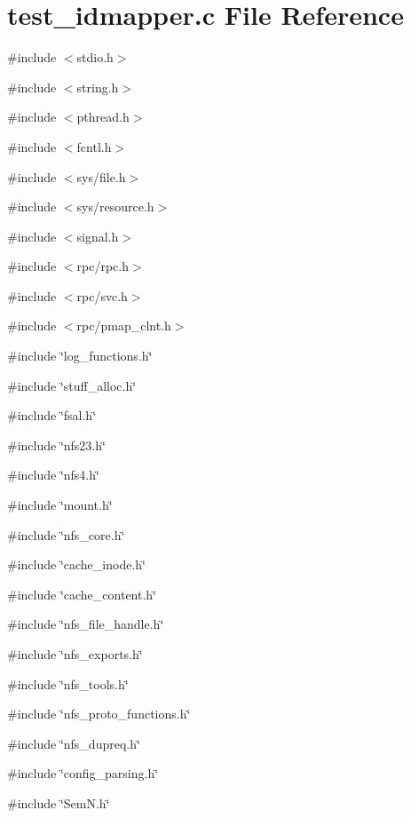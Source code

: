 \section{test\_\-idmapper.c File Reference}
\label{test__idmapper_8c}
{\ttfamily \#include $<$stdio.h$>$}\par
{\ttfamily \#include $<$string.h$>$}\par
{\ttfamily \#include $<$pthread.h$>$}\par
{\ttfamily \#include $<$fcntl.h$>$}\par
{\ttfamily \#include $<$sys/file.h$>$}\par
{\ttfamily \#include $<$sys/resource.h$>$}\par
{\ttfamily \#include $<$signal.h$>$}\par
{\ttfamily \#include $<$rpc/rpc.h$>$}\par
{\ttfamily \#include $<$rpc/svc.h$>$}\par
{\ttfamily \#include $<$rpc/pmap\_\-clnt.h$>$}\par
{\ttfamily \#include \char`\"{}log\_\-functions.h\char`\"{}}\par
{\ttfamily \#include \char`\"{}stuff\_\-alloc.h\char`\"{}}\par
{\ttfamily \#include \char`\"{}fsal.h\char`\"{}}\par
{\ttfamily \#include \char`\"{}nfs23.h\char`\"{}}\par
{\ttfamily \#include \char`\"{}nfs4.h\char`\"{}}\par
{\ttfamily \#include \char`\"{}mount.h\char`\"{}}\par
{\ttfamily \#include \char`\"{}nfs\_\-core.h\char`\"{}}\par
{\ttfamily \#include \char`\"{}cache\_\-inode.h\char`\"{}}\par
{\ttfamily \#include \char`\"{}cache\_\-content.h\char`\"{}}\par
{\ttfamily \#include \char`\"{}nfs\_\-file\_\-handle.h\char`\"{}}\par
{\ttfamily \#include \char`\"{}nfs\_\-exports.h\char`\"{}}\par
{\ttfamily \#include \char`\"{}nfs\_\-tools.h\char`\"{}}\par
{\ttfamily \#include \char`\"{}nfs\_\-proto\_\-functions.h\char`\"{}}\par
{\ttfamily \#include \char`\"{}nfs\_\-dupreq.h\char`\"{}}\par
{\ttfamily \#include \char`\"{}config\_\-parsing.h\char`\"{}}\par
{\ttfamily \#include \char`\"{}SemN.h\char`\"{}}\par
